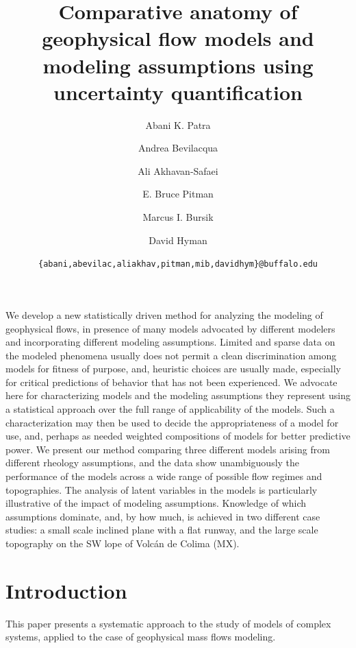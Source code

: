 \documentclass{article}
\begin{document}
\title{\bf Comparative anatomy of geophysical flow models and modeling assumptions using uncertainty quantification}
\author[1,3]{Abani K. Patra}
\author[2]{Andrea Bevilacqua}
\author[1]{Ali Akhavan-Safaei}
\author[4]{E. Bruce Pitman}
\author[2]{Marcus I. Bursik}
\author[2]{David Hyman}


\date{\texttt{\{abani,abevilac,aliakhav,pitman,mib,davidhym\}@buffalo.edu}}


\maketitle
\tableofcontents

\abstract
We develop a new statistically driven method for analyzing the modeling of geophysical flows, in presence of many models advocated by different modelers and incorporating different modeling assumptions. Limited and sparse data on the modeled phenomena usually does not permit a clean discrimination among models for fitness of purpose, and, heuristic choices are usually made, especially for critical predictions of behavior that has not been experienced. We advocate here for characterizing models and the modeling assumptions they represent using a statistical approach over the full range of applicability of the models. Such a characterization may then be used to decide the appropriateness of a model for use, and, perhaps as needed weighted compositions of models for better predictive power. We present our method comparing three different models arising from different rheology assumptions, and the data show unambiguously the performance of the models across a wide range of possible flow regimes and topographies. The analysis of latent variables in the models is particularly illustrative of the impact of modeling assumptions. Knowledge of which assumptions dominate, and, by how much, is achieved in two different case studies: a small scale inclined plane with a flat runway, and the large scale topography on the SW lope of Volc\'{a}n de Colima (MX).



\newpage
\section{Introduction}
This paper presents a systematic approach to the study of models of complex systems, applied to the case of geophysical mass flows modeling.
\end{document}
